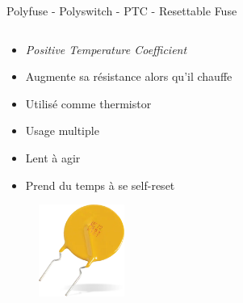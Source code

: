 \begin{frame}{Polyfuse - Polyswitch - PTC - Resettable Fuse}
    \begin{columns}
        \begin{column}{0.5\textwidth}
            \begin{itemize}
                \item \textit{Positive Temperature Coefficient}
                \item Augmente sa résistance alors qu'il chauffe
                \item Utilisé comme thermistor
                \bigskip
                \item Usage multiple
                \item Lent à agir
                \item Prend du temps à se self-reset
            \end{itemize}
            \vspace{12pt}
            \begin{figure}
                \centering
                \includegraphics[width=0.25\textwidth]{pictures/polyfuse.png}
            \end{figure}
        \end{column}


\end{columns}
\end{frame}
